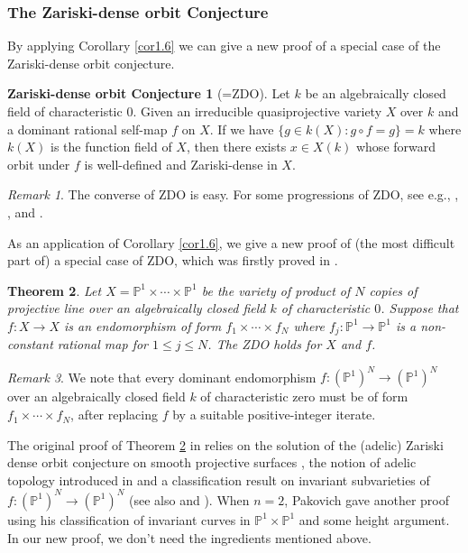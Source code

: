 \documentclass[12pt]{amsart}
\theoremstyle{plain}
\newtheorem{Thm}{Theorem}[section]
\newtheorem{Conj}[Thm]{Conjecture}
\theoremstyle{remark}
\newtheorem{Rem}[Thm]{Remark}
\theoremstyle{definition}
\newtheorem*{ZDO}{Zariski-dense orbit Conjecture}
\def\P{\mathbb P}
\begin{document}
\subsubsection{The Zariski-dense orbit Conjecture}
By applying Corollary \ref{cor1.6} we can give a new proof of a special case of the Zariski-dense orbit conjecture.
\begin{ZDO}[=ZDO]Let $k$ be an algebraically closed field of characteristic $0$. Given an irreducible quasiprojective variety $X$ over $k$ and a dominant rational self-map $f$ on $X$. If  we have $\{g\in k(X):g\circ f=g\}=k$ where $k(X)$ is the  function field of $X$, then there exists $x\in X(k)$ whose forward orbit under $f$ is well-defined and Zariski-dense in $X$.  
\end{ZDO}
\begin{Rem}
	The converse of ZDO is easy. For some progressions of ZDO, see e.g.\cite{Amerik2011}, \cite{Amerik2008}, \cite{Medvdev}, \cite{Xie2017} and \cite{Xie2022}.
\end{Rem}
As an application of Corollary \ref{cor1.6}, we give a new proof of (the most difficult part of) a special case of ZDO, which was firstly proved in \cite[Theorem 1.16]{Xie2022}. 
\begin{Thm}\label{thm1.8}
	Let $X=\P^1\times\cdots\times\P^1$ be the variety of product of $N$ copies of projective line over an algebraically closed field $k$ of characteristic $0$. Suppose that $f:X\to X$ is an endomorphism of form $f_1\times\cdots\times f_N$ where $f_j:\P^1\to\P^1$ is a non-constant rational map for $1\leq j\leq N$. The ZDO holds for $X$ and $f$.
\end{Thm}
\begin{Rem}
We note that every dominant endomorphism $f:(\P^1)^N\to(\P^1)^N$ over an algebraically closed field $k$ of characteristic zero must be of form $f_1\times\cdots\times f_N$, after replacing $f$ by a suitable positive-integer iterate. 
\end{Rem}

The original proof of Theorem \ref{thm1.8} in \cite{Xie2022} relies on the solution of the (adelic) Zariski dense orbit conjecture on smooth projective surfaces \cite[Theorem 1.15]{Xie2022}, the notion of adelic topology introduced in \cite[Section 3]{Xie2022} and a classification result on invariant subvarieties of $f:(\P^1)^N\to(\P^1)^N$ \cite[Proposition 9.2]{Xie2022} (see also \cite{Medvdev} and \cite{Ghioca2018c}). When $n=2$, Pakovich gave another proof \cite{Pakovich2023} using his classification of invariant curves in $\P^1\times \P^1$ and some height argument. 
In our new proof, we don't need the ingredients mentioned above. 
\end{document}
